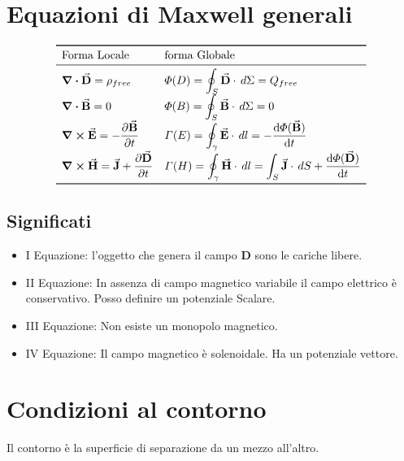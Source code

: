 \documentclass[a4paper]{scrarticle}
\begin{document}
    
\section{Equazioni di Maxwell generali}

\[
\begin{array}{ll}
    \toprule
    \text{Forma Locale} & \text {forma Globale} \\
    \midrule
    \displaystyle \div{\va D} = \rho_{free}             & \displaystyle \varPhi(D)   = \oint_S \va D \cdot \, d\Sigma= Q_{free}\\
    \displaystyle \div{\va B} = 0                       & \displaystyle \varPhi(B)   = \oint_S \va B \cdot \, d\Sigma= 0\\
    \displaystyle \curl{\va E}= -\pdv{\va B}{t}         & \displaystyle \varGamma(E) = \oint_\gamma \va E \cdot \,dl = -\dv{\varPhi(\va B)}{t}\\
    \displaystyle \curl{\va H}= \va J +  \pdv{\va D}{t} & \displaystyle \varGamma(H) = \oint_\gamma \va H \cdot \,dl = \int_S \va J \cdot \,dS + \dv{\varPhi( \va D)}{t}\\
    \bottomrule
\end{array}    
\]

\subsection{Significati}

\begin{itemize}
    \item I Equazione: l'oggetto che genera il campo $\bm D$ sono le cariche libere.
    \item II Equazione: In assenza di campo magnetico variabile il campo elettrico è conservativo. Posso definire un potenziale Scalare.
    \item III Equazione: Non esiste un monopolo magnetico.
    \item IV Equazione: Il campo magnetico è solenoidale. Ha un potenziale vettore.
\end{itemize}

\section{Condizioni al contorno}

Il contorno è la superficie di separazione da un mezzo all'altro.
\end{document}
